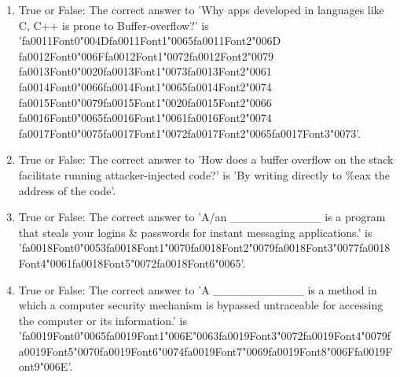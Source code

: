 \documentclass[12pt]{article}
\begin{document}
\begin{enumerate}[label=\arabic*.]
\item True or False: The correct answer to 'Why apps developed in languages like C, C++ is prone to Buffer-overflow?' is '{\csname fa0011Font0\endcsname\char"004D}{\csname fa0011Font1\endcsname\char"0065}{\csname fa0011Font2\endcsname\char"006D} {\csname fa0012Font0\endcsname\char"006F}{\csname fa0012Font1\endcsname\char"0072}{\csname fa0012Font2\endcsname\char"0079} {\csname fa0013Font0\endcsname\char"0020}{\csname fa0013Font1\endcsname\char"0073}{\csname fa0013Font2\endcsname\char"0061} {\csname fa0014Font0\endcsname\char"0066}{\csname fa0014Font1\endcsname\char"0065}{\csname fa0014Font2\endcsname\char"0074} {\csname fa0015Font0\endcsname\char"0079}{\csname fa0015Font1\endcsname\char"0020}{\csname fa0015Font2\endcsname\char"0066} {\csname fa0016Font0\endcsname\char"0065}{\csname fa0016Font1\endcsname\char"0061}{\csname fa0016Font2\endcsname\char"0074} {\csname fa0017Font0\endcsname\char"0075}{\csname fa0017Font1\endcsname\char"0072}{\csname fa0017Font2\endcsname\char"0065}{\csname fa0017Font3\endcsname\char"0073}'.
\item True or False: The correct answer to 'How does a buffer overflow on the stack facilitate running attacker-injected code?' is 'By writing directly to \%eax the address of the code'.
\item True or False: The correct answer to 'A/an \_\_\_\_\_\_\_\_\_\_\_ is a program that steals your logins \& passwords for instant messaging applications.' is '{\csname fa0018Font0\endcsname\char"0053}{\csname fa0018Font1\endcsname\char"0070}{\csname fa0018Font2\endcsname\char"0079}{\csname fa0018Font3\endcsname\char"0077}{\csname fa0018Font4\endcsname\char"0061}{\csname fa0018Font5\endcsname\char"0072}{\csname fa0018Font6\endcsname\char"0065}'.
\item True or False: The correct answer to 'A \_\_\_\_\_\_\_\_\_\_\_ is a method in which a computer security mechanism is bypassed untraceable for accessing the computer or its information.' is '{\csname fa0019Font0\endcsname\char"0065}{\csname fa0019Font1\endcsname\char"006E}{\char"0063}{\csname fa0019Font3\endcsname\char"0072}{\csname fa0019Font4\endcsname\char"0079}{\csname fa0019Font5\endcsname\char"0070}{\csname fa0019Font6\endcsname\char"0074}{\csname fa0019Font7\endcsname\char"0069}{\csname fa0019Font8\endcsname\char"006F}{\csname fa0019Font9\endcsname\char"006E}'.

\end{enumerate}
\end{document}
